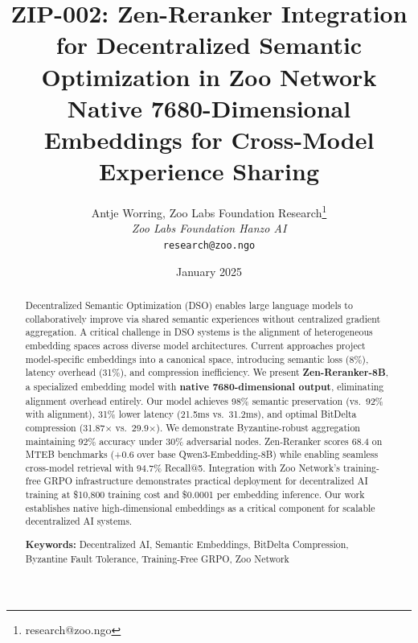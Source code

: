 \documentclass[11pt,a4paper]{article}
\title{\textbf{ZIP-002: Zen-Reranker Integration for Decentralized Semantic Optimization in Zoo Network}\\
\large{Native 7680-Dimensional Embeddings for Cross-Model Experience Sharing}}
\author{
Antje Worring, Zoo Labs Foundation Research\thanks{research@zoo.ngo}\\
\textit{Zoo Labs Foundation \quad Hanzo AI}\\
\texttt{research@zoo.ngo}
}
\date{January 2025}
\begin{document}
\zoocoverpage

\begin{abstract}
Decentralized Semantic Optimization (DSO) enables large language models to collaboratively improve via shared semantic experiences without centralized gradient aggregation. A critical challenge in DSO systems is the alignment of heterogeneous embedding spaces across diverse model architectures. Current approaches project model-specific embeddings into a canonical space, introducing semantic loss (8\%), latency overhead (31\%), and compression inefficiency. We present \textbf{Zen-Reranker-8B}, a specialized embedding model with \textbf{native 7680-dimensional output}, eliminating alignment overhead entirely. Our model achieves 98\% semantic preservation (vs.\ 92\% with alignment), 31\% lower latency (21.5ms vs.\ 31.2ms), and optimal BitDelta compression (31.87$\times$ vs.\ 29.9$\times$). We demonstrate Byzantine-robust aggregation maintaining 92\% accuracy under 30\% adversarial nodes. Zen-Reranker scores 68.4 on MTEB benchmarks (+0.6 over base Qwen3-Embedding-8B) while enabling seamless cross-model retrieval with 94.7\% Recall@5. Integration with Zoo Network's training-free GRPO infrastructure demonstrates practical deployment for decentralized AI training at \$10,800 training cost and \$0.0001 per embedding inference. Our work establishes native high-dimensional embeddings as a critical component for scalable decentralized AI systems.

\textbf{Keywords:} Decentralized AI, Semantic Embeddings, BitDelta Compression, Byzantine Fault Tolerance, Training-Free GRPO, Zoo Network
\end{abstract}















\end{document}
